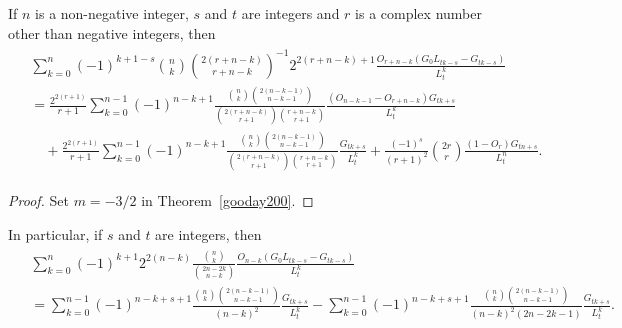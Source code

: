 \documentclass[12pt,reqno]{article}
\begin{document}
\begin{corollary}
If $n$ is a non-negative integer, $s$ and $t$ are integers and $r$ is a complex number other than negative integers, then 
\begin{align}\label{go140}
	\begin{split}
		&\sum_{k=0}^n(-1)^{k+1-s}\binom{n}{k}\binom{2(r+n-k)}{r+n-k}^{-1}2^{2(r+n-k)+1}\frac{O_{r+n-k}\left(G_0L_{tk-s}-G_{tk-s}\right)}{L_t^k}\\
		&=\frac{2^{2(r+1)}}{r+1}\sum_{k=0}^{n-1}(-1)^{n-k+1}\frac{\binom{n}{k}\binom{2(n-k-1)}{n-k-1}}{\binom{2(r+n-k)}{r+1}\binom{r+n-k}{r+1}}\frac{\left(O_{n-k-1}-O_{r+n-k}\right)G_{tk+s}}{L_t^k}\\
		&\quad +\frac{2^{2(r+1)}}{r+1}\sum_{k=0}^{n-1}(-1)^{n-k+1}\frac{\binom{n}{k}\binom{2(n-k-1)}{n-k-1}}{\binom{2(r+n-k)}{r+1}\binom{r+n-k}{r+1}}\frac{G_{tk+s}}{L_t^k}+\frac{(-1)^s}{(r+1)^2}\binom{2r}{r}\frac{(1-O_r)G_{tn+s}}{L_t^n}.
	\end{split}
\end{align}
\end{corollary}
\begin{proof}
Set $m=-3/2$ in Theorem~\ref{gooday200}.
\end{proof}
In particular, if $s$ and $t$ are integers, then
\begin{align}\label{may10}
	\begin{split}
		&\sum_{k=0}^n (-1)^{k+1}2^{2(n-k)}\frac{\binom{n}{k}}{\binom{2n-2k}{n-k}}\frac{O_{n-k}\left(G_0L_{tk-s}-G_{tk-s}\right)}{L_t^k}\\
		&=\sum_{k=0}^{n-1}(-1)^{n-k+s+1}\frac{\binom{n}{k}\binom{2(n-k-1)}{n-k-1}}{(n-k)^2}\frac{G_{tk+s}}{L_t^k}
		 -\sum_{k=0}^{n-1}(-1)^{n-k+s+1}\frac{\binom{n}{k}\binom{2(n-k-1)}{n-k-1}}{(n-k)^2(2n-2k-1)}\frac{G_{tk+s}}{L_t^k}.
	\end{split}
\end{align}

	
	
\end{document}

